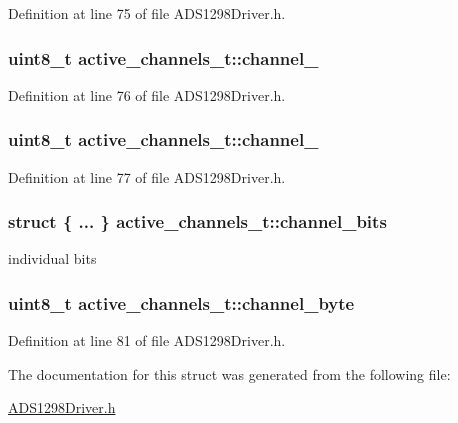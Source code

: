 \-Definition at line 75 of file \-A\-D\-S1298\-Driver.\-h.

\hypertarget{structactive__channels__t_a2bc29deaea047a36824f03159e3d0158}{
\subsubsection[{channel\-\_\-7}]{\setlength{\rightskip}{0pt plus 5cm}uint8\-\_\-t {\bf active\-\_\-channels\-\_\-t\-::channel\-\_}}}\label{structactive__channels__t_a2bc29deaea047a36824f03159e3d0158}


\-Definition at line 76 of file \-A\-D\-S1298\-Driver.\-h.

\hypertarget{structactive__channels__t_ab91881cb0fd2ec1f8fd59e30e8fc279b}{
\subsubsection[{channel\-\_\-8}]{\setlength{\rightskip}{0pt plus 5cm}uint8\-\_\-t {\bf active\-\_\-channels\-\_\-t\-::channel\-\_}}}\label{structactive__channels__t_ab91881cb0fd2ec1f8fd59e30e8fc279b}


\-Definition at line 77 of file \-A\-D\-S1298\-Driver.\-h.

\hypertarget{structactive__channels__t_a7856ced3f539238aa3a3287a775690b4}{
\subsubsection[{channel\-\_\-bits}]{\setlength{\rightskip}{0pt plus 5cm}struct \{ ... \}   {\bf active\-\_\-channels\-\_\-t\-::channel\-\_\-bits}}}\label{structactive__channels__t_a7856ced3f539238aa3a3287a775690b4}


individual bits 

\hypertarget{structactive__channels__t_a68c8307495350c21226b0a541c219486}{
\subsubsection[{channel\-\_\-byte}]{\setlength{\rightskip}{0pt plus 5cm}uint8\-\_\-t {\bf active\-\_\-channels\-\_\-t\-::channel\-\_\-byte}}}\label{structactive__channels__t_a68c8307495350c21226b0a541c219486}


\-Definition at line 81 of file \-A\-D\-S1298\-Driver.\-h.



\-The documentation for this struct was generated from the following file\-:\begin{DoxyCompactItemize}
\item 
\hyperlink{_a_d_s1298_driver_8h}{\-A\-D\-S1298\-Driver.\-h}\end{DoxyCompactItemize}
